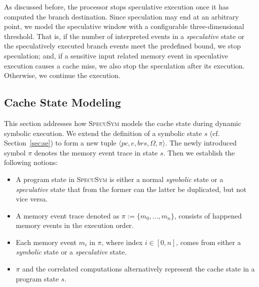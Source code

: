 \documentclass[sigconf,screen]{acmart}
\newcommand\ignore[1]{}
\newcommand{\pcon}{\mathit{pc}}
\newcommand{\SpecuSym}{\textsc{SpecuSym} }
\begin{document}
As discussed before, the processor stops speculative execution once it has computed
the branch destination. Since speculation may end at an arbitrary point, we model 
the speculative window with a configurable three-dimensional threshold. That is, if 
the number of interpreted events in a \textit{speculative} state or the speculatively 
executed branch events meet the predefined bound, we stop speculation; and, if a 
sensitive input related memory event in speculative execution causes a cache miss, 
we also stop the speculation after its execution. Otherwise, we continue the execution.


\subsection{Cache State Modeling}
\label{sec:modeling}


This section addresses how \SpecuSym models the cache state during dynamic
symbolic execution. We extend the definition of a symbolic state $s$ (cf.
Section~\ref{sec:se}) to form a new tuple $\langle \pcon, \mathit{e},
\mathit{brs},\Omega,\pi\rangle$. The newly introduced symbol $\pi$ denotes 
the memory event trace in state $s$. Then we establish the following notions:
%
%
\begin{itemize}
  \item A program state in \SpecuSym is either a normal \textit{symbolic} state 
	or a \textit{speculative} state that from the former can the latter be 
	duplicated, but not vice versa. 
  \item A memory event trace denoted as $\pi:=\mathit{\{m_0,...,m_n\}}$, 
    consists of happened memory events in the execution order.
  \item Each memory event $\mathit{m_i}$ in $\pi$, where index $i\in [0,n]$, 
	comes from either a \textit{symbolic} state or a \textit{speculative} state.
  \item $\pi$ and the correlated computations alternatively represent the cache 
	state in a program state $s$.
\end{itemize}
%
%
\ignore{
On modeling the cache state, exsiting tools such as CaSym~\cite{BrotzmanLZTK2018} 
maintains and updates cache mappings during symbolic execution; others like 
Chalice~\cite{ChattopadhyayBRZ17} and \textsc{SymSC}~\cite{GuoWW18} uses 
offline constraint solving to to reason about the cache behaviors of memory 
accesses upon concrete cache models. To better coordinate the speculative 
modeling component, \SpecuSym adopts an on-the-fly analysis.
}
\end{document}
